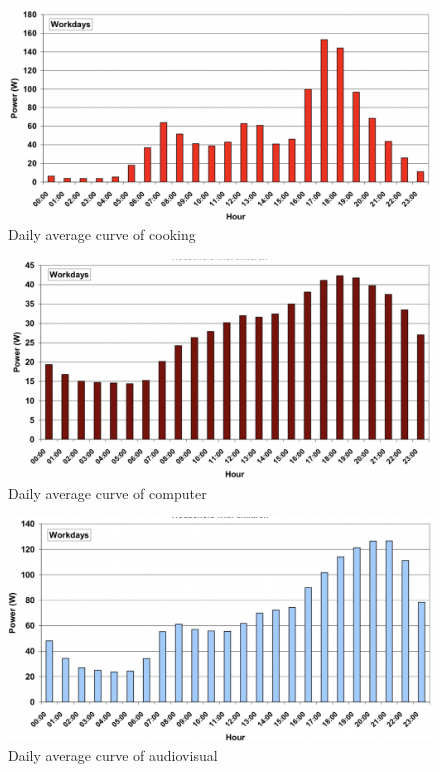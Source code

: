 \documentclass[12pt,a4paper]{report}
\begin{document}
    \begin{figure}[ht]
        \centerline{\includegraphics[scale=1]{cooking}}
        \caption{Daily average curve of cooking}
        \label{fig_cooking}
    \end{figure}
    \begin{figure}[ht]
        \centerline{\includegraphics[scale=1]{computer}}
        \caption{Daily average curve of computer}
        \label{fig_computer}
    \end{figure}
    \begin{figure}[ht]
        \centerline{\includegraphics[scale=1]{audiovisual}}
        \caption{Daily average curve of audiovisual}
        \label{fig_audiovisual}
    \end{figure}
\end{document}

